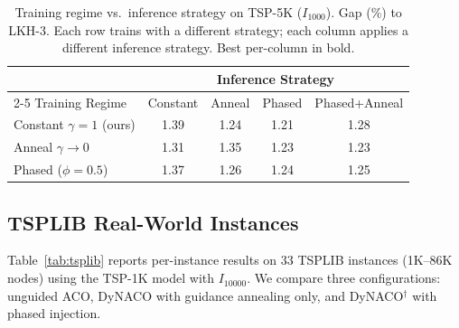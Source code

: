 \documentclass[sigconf]{acmart}
\begin{document}
\begin{table}[h]
\centering
\caption{Training regime vs.\ inference strategy on TSP-5K ($I_{1000}$). Gap (\%) to LKH-3. Each row trains with a different strategy; each column applies a different inference strategy. Best per-column in bold.}
\label{tab:train-strategy}
\small
\begin{tabular}{lcccc}
\toprule
& \multicolumn{4}{c}{Inference Strategy} \\
\cmidrule(lr){2-5}
Training Regime & Constant & Anneal & Phased & Phased+Anneal \\
\midrule
Constant $\gamma{=}1$ (ours)               & 1.39 & 1.24 & 1.21 & 1.28 \\
Anneal $\gamma{\to}0$                       & 1.31 & 1.35 & 1.23 & 1.23 \\
Phased ($\phi{=}0.5$)                       & 1.37 & 1.26 & 1.24 & 1.25 \\
\bottomrule
\end{tabular}
\end{table}

\subsection{TSPLIB Real-World Instances}
\label{app:tsplib}

Table~\ref{tab:tsplib} reports per-instance results on 33 TSPLIB instances (1K--86K nodes) using the TSP-1K model with $I_{10000}$.
We compare three configurations: unguided ACO, DyNACO with guidance annealing only, and DyNACO$^{\dagger}$ with phased injection.
\end{document}
